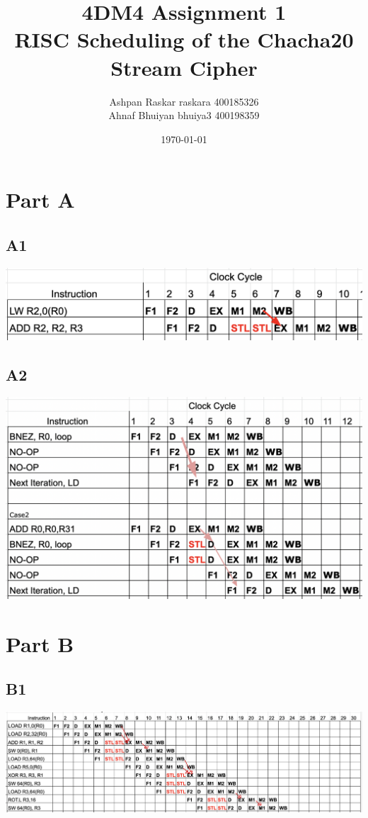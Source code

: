 \documentclass[12pt, letterpaper, titlepage, hidelinks]{article}
\title{4DM4 Assignment 1 \\ RISC Scheduling of the Chacha20 Stream Cipher}
\author{Ashpan Raskar raskara 400185326\\
		Ahnaf Bhuiyan bhuiya3 400198359}
\date{\today}
\begin{document}
\maketitle
\tableofcontents
\newpage
\setlength{\parindent}{0pt}
\setcounter{secnumdepth}{0}
\section{Part A}
	\subsection{A1}
		\includegraphics[width=\textwidth]{A1}
	\subsection{A2}
	\includegraphics[width=\textwidth]{A2}
\section{Part B}
	\subsection{B1}
		\includegraphics[width=\textwidth]{B1}
\end{document}
